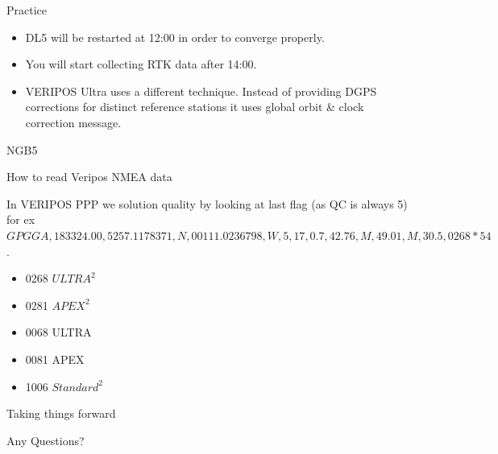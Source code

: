 \documentclass[12pt]{beamer}
\begin{document}
\begin{frame}{Practice}
	
	\begin{itemize}
		\item DL5 will be restarted at 12:00 in order to converge properly.
		\item You will start collecting RTK data after 14:00. 
		\item VERIPOS Ultra uses a different technique. Instead of providing DGPS corrections for
		distinct reference stations it uses global orbit \& clock correction message.
	\end{itemize}
	

	
\end{frame}


\begin{frame}{NGB5}
	\begin{table}
		\centering
		\begin{minipage}[t]{\textwidth}%
			\caption{Coordinates of NGB5}
		\end{minipage}
	\end{table}
	
\end{frame}



\begin{frame}{How to read Veripos NMEA data}
	
	In VERIPOS PPP we solution quality by looking at last flag (as QC is always 5) for ex $GPGGA,183324.00,5257.1178371,N,00111.0236798,W,5,17,0.7,42.76,M,49.01,M,30.5,0268*54$.
	
	\begin{itemize}
		\item 0268	$ULTRA^2$
		\item 0281	$APEX^2$
		\item 0068	ULTRA
		\item 0081	APEX
		\item 1006	$Standard^2$
	\end{itemize}
	
\end{frame}



\begin{frame}{Taking things forward}
\begin{Large} %
	Any Questions?
\end{Large}
\end{frame}
\end{document}
